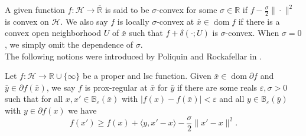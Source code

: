 \documentclass[smallextended,envcountsect,envcountsame]{svjour3}
\renewcommand{\H}{\mathcal{H}}
\newcommand{\R}{\mathbb{R}}
\newcommand{\Rex}{\overline{\mathbb{R}}}
\newcommand{\dom}{\operatorname{dom}}
\renewcommand{\epsilon}{\varepsilon}
\newcommand{\1}{\mathds{1}}
\begin{document}
    A given function $f\colon \H\to \Rex$ is said to be $\sigma$-convex for some $\sigma\in\R$ if $f-\frac{\sigma}{2}\|\cdot\|^2$ is convex on $\H$. We also say $f$ is locally $\sigma$-convex at $\bar x\in \dom f$ if there is a convex open neighborhood $U$ of $\bar x$ such that $f+\delta(\cdot;U)$ is $\sigma$-convex. When $\sigma = 0$, we simply omit the dependence of $\sigma$.\\
    The following notions were introduced by Poliquin and Rockafellar in \cite{Poliquin1996}.
	\begin{definition}
		Let $f\colon \H\to\R\cup\{\infty\}$ be a proper and lsc function. Given $\bar x\in \dom \partial f$ and $\bar y\in \partial f(\bar x)$, we say $f$ is prox-regular at $\bar x$ for $\bar y$ if there are some reals $\epsilon,\sigma>0$ such that for all $x,x'\in \mathbb{B}_{\epsilon}(\bar x)$ with $|f(x)-f(\bar x)|<\epsilon$ and all $y\in \mathbb{B}_{\epsilon}(\bar y)$ with $y\in \partial f(x)$ we have
		\begin{equation}\label{pr-def}
			f(x')\geq f(x) + \langle y,x'-x\rangle - \frac{\sigma}{2}\|x'-x\|^2.
		\end{equation}
	\end{definition}
		
\end{document}
